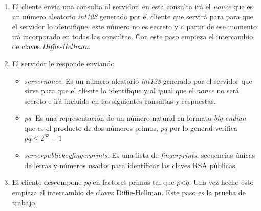 \begin{enumerate}
	\item El cliente envía una consulta al servidor, en esta consulta irá el \emph{nonce} que es un número aleatorio \emph{int128} generado por el cliente que servirá para para que el servidor lo identifique, este número no es secreto y a partir de ese momento irá incorporado en todas las consultas. Con este paso empieza el intercambio de claves \emph{Diffie-Hellman}.
	
	\item El servidor le responde enviando 
	\begin{itemize}
		\item \emph{server\textunderscore nonce}: Es un número aleatorio \emph{int128} generado por el servidor que sirve para que el cliente lo identifique y al igual que el \emph{nonce} no será secreto e irá incluido en las siguientes consultas y respuestas. 
		\item \emph{pq}: Es una representación de un número natural en formato \emph{big endian} que es el producto de dos números primos, \emph{pq} por lo general verifica $pq \leq 2^{63}-1$
		\item \emph{server\textunderscore public\textunderscore key\textunderscore fingerprints}: Es una lista de \emph{fingerprints}, secuencias únicas de letras y números usadas para identificar las claves RSA públicas.
	\end{itemize}

	\item El cliente descompone \emph{pq} en factores primos tal que $p$\textless$q$. Una vez hecho esto empieza el intercambio de claves Diffie-Hellman. Este paso es la prueba de trabajo.


\end{enumerate}
